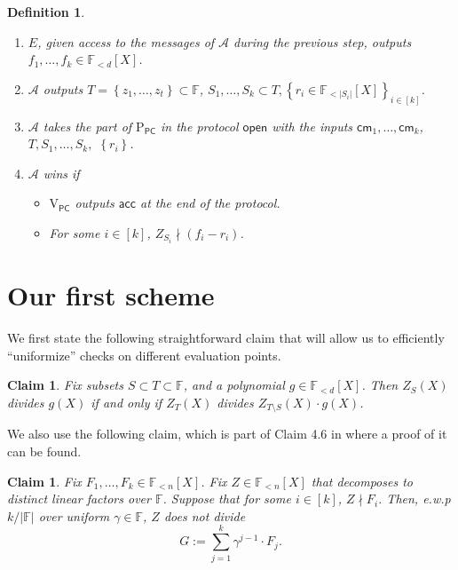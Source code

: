 \documentclass[11pt]{article} %
\newcommand{\F}{\ensuremath{\mathbb F}\xspace}
\newcommand{\adv}{\ensuremath{\mathcal A}\xspace}
\newcommand{\cm}{\ensuremath{\mathsf{cm}}\xspace}
\newcommand{\open}{\ensuremath{\mathsf{open}}\xspace}
\newcommand{\acc}{\ensuremath{\mathsf{acc}}\xspace}
\newcommand{\defeq}{:=}
\newcommand{\sett}[2]{\ensuremath{\set{#1}_{#2}}\xspace}
\newcommand{\prvpc}{\ensuremath{\mathrm{P_{\mathsf{PC}}}}\xspace}
\newcommand{\verpc}{\ensuremath{\mathrm{V_{\mathsf{PC}}}}\xspace}
\newcommand{\ext}{\ensuremath{E}\xspace}
\newcommand{\set}[1]{\ensuremath{\left\{#1\right\}}\xspace}
\newcommand{\polysofdeg}[1]{\ensuremath{\F_{< #1}[X]}\xspace}
\newtheorem{dfn}[lemma]{Definition}
\newtheorem{claim}[lemma]{Claim}
\begin{document}
\begin{dfn}
\begin{itemize}
\begin{itemize}
\begin{enumerate}
  \item \ext, given access to the messages of \adv during the previous step, outputs $f_1,\ldots,f_k \in \polysofdeg{d}$.
  \item \adv outputs $T=\set{z_1,\ldots,z_t}\subset \F$, $S_1,\ldots,S_k \subset T, \sett{r_i\in \polysofdeg{|S_i|}}{i\in [k]}$.
  \item \adv takes the part of \prvpc in the protocol \open with the inputs
  $\cm_1,\ldots,\cm_k$, $T, S_1,\ldots,S_k,$  $\set{r_i}$.
  \item $\adv$ wins if
  \begin{itemize}
   \item \verpc outputs \acc at the end of the protocol.
   \item For some $i\in [k]$, $Z_{S_i}\nmid (f_i-r_i)$.
  \end{itemize}

 \end{enumerate}

\end{itemize}
\end{itemize}
\end{dfn}


\section{Our first scheme}\label{sec:main}



We first state the following straightforward claim that will allow us to efficiently ``uniformize'' checks on different evaluation points.
\begin{claim}\label{clm:div}
 Fix subsets $S\subset T\subset \F$, and a polynomial $g \in \polysofdeg{d}$.
 Then $Z_S(X)$ divides $g(X)$ if and only if $Z_T(X)$ divides $Z_{T\setminus S}(X)\cdot g(X)$.
\end{claim}






We also use the following claim, which is part of Claim 4.6 in \cite{plonk} where a proof of it can be found.
\begin{claim}\label{clm:div_sum}
 Fix $F_1,\ldots,F_k \in \polysofdeg{n}$. Fix $Z\in \polysofdeg{n}$ that decomposes to distinct linear factors over \F.
 Suppose that for some $i\in [k]$, $Z\nmid F_i$.
 Then, e.w.p $k/|\F|$ over uniform $\gamma\in \F$, $Z$ does not divide
 \[G\defeq \sum_{j=1}^k \gamma ^{j-1} \cdot F_j.\]

\end{claim}
\end{document}
